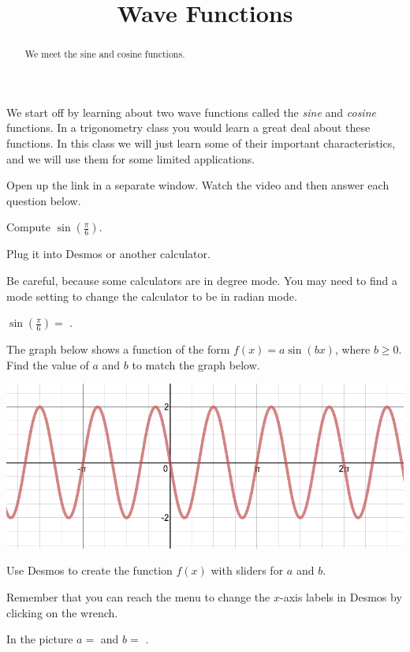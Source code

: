 \documentclass{ximera}
\title{Wave Functions}
\begin{document}
\begin{abstract}
We meet the sine and cosine functions.
\end{abstract}
\maketitle


We start off by learning about two wave functions called the \emph{sine} and \emph{cosine} functions. In a trigonometry class you would learn a great deal about these functions. In this class we will just learn some of their important characteristics, and we will use them for some limited applications.

Open up the link  in a separate window. Watch the video and then answer each question below. 

\begin{question}
Compute $\sin\left(\frac{\pi}{6}\right)$.
 
\begin{hint}
Plug it into Desmos or another calculator. 
\end{hint}
\begin{hint}
Be careful, because some calculators are in degree mode. You may need to find a mode setting to change the calculator to be in radian mode.
\end{hint}
$\sin\left(\frac{\pi}{6}\right)=$ .

\end{question}

\begin{question}
The graph below shows a function of the form $f(x)=a\sin(bx)$, where $b\ge0$. Find the value of $a$ and $b$ to match the graph below.
\begin{image}
\includegraphics{mysterysine.png}
\end{image}

\begin{hint}
Use Desmos to create the function $f(x)$ with sliders for $a$ and $b$. 
\end{hint}
\begin{hint}
Remember that you can reach the menu to change the $x$-axis labels in Desmos by clicking on the wrench.
\end{hint}
In the picture $a=$  and $b=$ .

\end{question}
\end{document}
